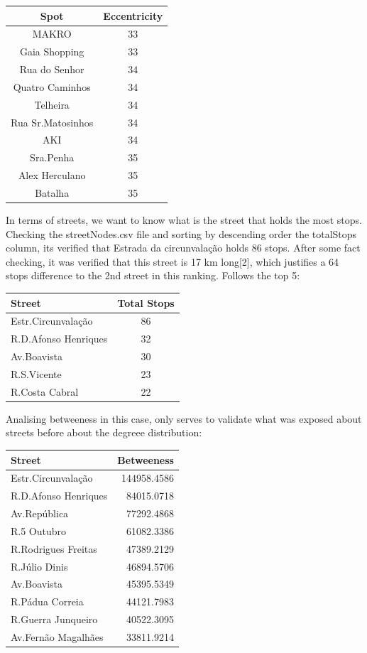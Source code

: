 \documentclass[12pt]{article}
\begin{document}
\begin{multicols}{2}
\begin{center}
\begin{tabular}[h]{|c|c|}
\hline
Spot & Eccentricity\\
\hline
MAKRO &	33\\
Gaia Shopping & 33\\
Rua do Senhor & 34\\
Quatro Caminhos	& 34\\
Telheira & 34\\
Rua Sr.Matosinhos & 34\\
AKI & 34\\
Sra.Penha & 35\\
Alex Herculano & 35\\
Batalha & 35\\
\hline
\end{tabular}
\end{center}


In terms of streets, we want to know what is the street that holds the most stops. Checking the streetNodes.csv file and sorting by descending order the totalStops column, its verified that Estrada da circunvalação holds 86 stops. After some fact checking, it was verified that this street is 17 km long[2], which justifies a 64 stops difference to the 2nd street in this ranking. Follows the top 5:
\begin{center}
\begin{tabular}[h]{|l|c|}
\hline
Street & Total Stops\\
\hline
Estr.Circunvalação & 86\\
R.D.Afonso Henriques & 32\\
Av.Boavista	& 30\\
R.S.Vicente& 23\\
R.Costa Cabral & 22\\
\hline
\end{tabular}
\end{center} 

Analising betweeness in this case, only serves to validate what was exposed about streets before about the degreee distribution:\\
\begin{center}
\begin{tabular}[h]{|l|r|}
\hline
Street & Betweeness\\
\hline
Estr.Circunvalação	& 144958.4586 \\
R.D.Afonso Henriques &	84015.0718\\
Av.República &	77292.4868\\
R.5 Outubro	& 61082.3386\\
R.Rodrigues Freitas &	47389.2129\\
R.Júlio Dinis	& 46894.5706\\
Av.Boavista &	45395.5349\\
R.Pádua Correia &	44121.7983\\
R.Guerra Junqueiro &	40522.3095\\
Av.Fernão Magalhães &	33811.9214\\


\end{tabular}
\end{center}
\end{multicols}
\end{document}
